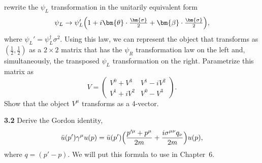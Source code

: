 \begin{enumerate}[label=(\alph*)]
    rewrite the $\psi_L$ transformation in the unitarily equivalent form
    \begin{equation}
      \psi_L \to \psi_L'\Bigl( 1 + i\bm{\theta}\cdot\tfrac{\bm{\sigma}}{2}
        + \bm{\beta}\cdot\tfrac{\bm{\sigma}}{2} \Bigr),
    \end{equation}
    where $\psi_L' = \psi_L^{\dagger}\sigma^2$.  Using this law, we can
    represent the object that transforms as $(\tfrac{1}{2}, \tfrac{1}{2})$ as
    a $2\times2$ matrix that has the $\psi_R$ transformation law on the left
    and, simultaneously, the transposed $\psi_L$ transformation on the right.
    Parametrize this matrix as
    \begin{equation}
      V = \begin{pmatrix}
        V^0 + V^3 & V^1 - iV^2\\
        V^1 + iV^2 & V^0 - V^3
      \end{pmatrix}.
    \end{equation}
    Show that the object $V^\mu$ transforms as a 4-vector.
\end{enumerate}

\textbf{3.2} Derive the Gordon identity,
\begin{equation}
  \bar{u}(p')\gamma^\mu u(p) = \bar{u}(p')\Bigl(
    \frac{p'^{\mu} + p^{\mu}}{2m} + \frac{i\sigma^{\mu\nu}q_\nu}{2m}
    \Bigr)u(p),
\end{equation}
where $q = (p' - p)$.  We will put this formula to use in Chapter~6.

